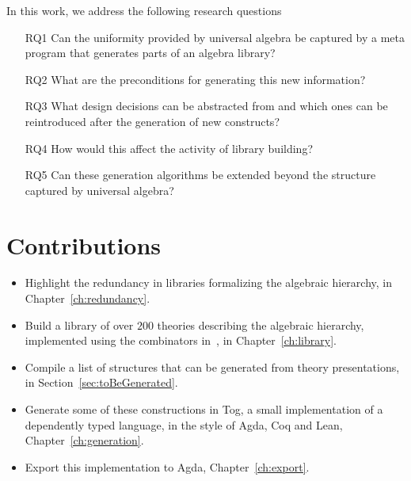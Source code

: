 In this work, we address the following research questions 
\begin{enumerate}
    \item[RQ1] Can the uniformity provided by universal algebra be captured by a meta program that generates parts of an algebra library? 
    \item[RQ2] What are the preconditions for generating this new information? 
    \item[RQ3] What design decisions can be abstracted from and which ones can be reintroduced after the generation of new constructs?
    \item[RQ4] How would this affect the activity of library building?
    \item[RQ5] Can these generation algorithms be extended beyond the structure captured by universal algebra? 
\end{enumerate}

\section{Contributions}
\begin{itemize}
    \item Highlight the redundancy in libraries formalizing the algebraic hierarchy, in Chapter~\ref{ch:redundancy}. 
    \item Build a library of over $200$ theories describing the algebraic hierarchy, implemented using the combinators in~\cite{carette2018building}, in Chapter~\ref{ch:library}. 
    \item Compile a list of structures that can be generated from theory presentations, in Section~\ref{sec:toBeGenerated}. 
    \item Generate some of these constructions in Tog, a small implementation of a dependently typed language, in the style of Agda, Coq and Lean, Chapter~\ref{ch:generation}. 
    \item Export this implementation to Agda, Chapter~\ref{ch:export}. 
\end{itemize}  

